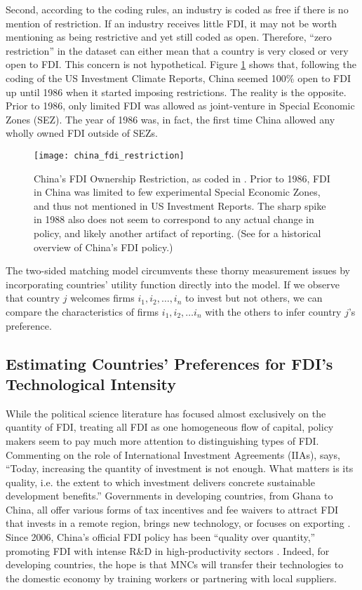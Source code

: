 Second, according to the coding rules, an industry is coded as free if there is
no mention of restriction. If an industry receives little FDI, it may not be
worth mentioning as being restrictive and yet still coded as open. Therefore,
``zero restriction'' in the dataset can either mean that a country is very
closed or very open to FDI. This concern is not hypothetical. Figure \ref{fig:china_fdi_restriction} shows that, following the coding of the US Investment Climate Reports, China seemed 100\% open to FDI up until 1986 when it started imposing restrictions. The reality is the opposite. Prior to 1986, only limited FDI was allowed as joint-venture in Special Economic Zones (SEZ). The year of 1986 was, in fact, the first time China allowed any wholly owned FDI outside of SEZs.

\begin{figure}[!ht]
\centering
\texttt{[image: china\_fdi\_restriction]}
\caption{China's FDI Ownership Restriction, as coded in \citet{Pandya2010}. Prior to 1986, FDI in China was limited to few experimental Special Economic Zones, and thus not mentioned in US Investment Reports. The sharp spike in 1988 also does not seem to correspond to any actual change in policy, and likely another artifact of reporting. (See \citet{Zebregs2002} for a historical overview of China's FDI policy.)}
\label{fig:china_fdi_restriction}
\end{figure}

The two-sided matching model circumvents these thorny measurement issues by incorporating countries' utility function directly into the model. If we observe that country $j$ welcomes firms $i_1, i_2, \dots, i_n$ to invest but not others, we can compare the characteristics of firms $i_1, i_2, \dots i_n$ with the others to infer country $j$'s preference.


\subsection{Estimating Countries' Preferences for FDI's Technological Intensity}

While the political science literature has focused almost exclusively on the quantity of FDI, treating all FDI as one homogeneous flow of capital, policy makers seem to pay much more attention to distinguishing types of FDI. Commenting on the role of International Investment Agreements (IIAs), \citet{UNCTAD2015} says, ``Today, increasing the quantity of investment is not enough. What matters is its quality, i.e. the extent to which investment delivers concrete sustainable development benefits.'' Governments in developing countries, from Ghana to China, all offer various forms of tax incentives and fee waivers to attract FDI that invests in a remote region, brings new technology, or focuses on exporting \citep{Ricupero2000}. Since 2006, China's official FDI policy has been ``quality over quantity,'' promoting FDI with intense R\&D in high-productivity sectors \citep{Guangzhou2011}. Indeed, for developing countries, the hope is that MNCs will transfer their technologies to the domestic economy by training workers or partnering with local suppliers.

